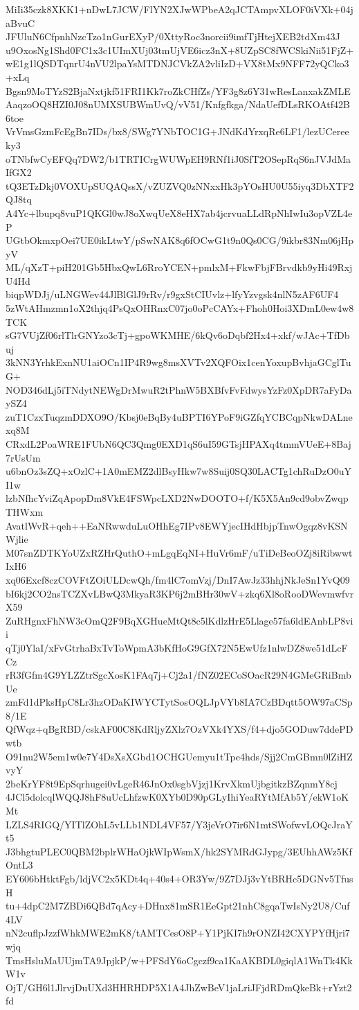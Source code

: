 MiIi35czk8XKK1+nDwL7JCW/FlYN2XJwWPbeA2qJCTAmpvXLOF0iVXk+04jaBvuC
JFUluN6CfpnhNzcTzo1nGurEXyP/0XttyRoc3norcii9imfTjHtejXEB2tdXm43J
u9OxosNg1Shd0FC1x3c1UImXUj03tmUjVE6icz3nX+8UZpSC8fWCSkiNii51FjZ+
wE1g1lQSDTqnrU4nVU2lpaYsMTDNJCVkZA2vliIzD+VX8tMx9NFF72yQCko3+xLq
Bgsn9MoTYzS2BjaNxtjkf51FRI1Kk7roZkCHfZs/YF3g8z6Y31wResLanxakZMLE
AaqzoOQ8HZI0J08nUMXSUBWmUvQ/vV51/Knfgfkga/NdaUefDLsRKOAtf42B6toe
VrVmsGzmFcEgBn7IDs/bx8/SWg7YNbTOC1G+JNdKdYrxqRe6LF1/lezUCereeky3
oTNbfwCyEFQq7DW2/b1TRTICrgWUWpEH9RNf1iJ0SfT2OSepRqS6nJVJdMaIfGX2
tQ3ETzDkj0VOXUpSUQAQssX/vZUZVQ0zNNxxHk3pYOsHU0U55iyq3DbXTF2QJ8tq
A4Yc+lbupq8vuP1QKGl0wJ8oXwqUeX8eHX7ab4jcrvuaLLdRpNhIwIu3opVZL4eP
UGtbOkmxpOei7UE0ikLtwY/pSwNAK8q6fOCwG1t9n0Qs0CG/9ikbr83Nm06jHpyV
ML/qXzT+piH201Gb5HbxQwL6RroYCEN+pmlxM+FkwFbjFBrvdkb9yHi49RxjU4Hd
biqpWDJj/uLNGWev44JlBlGlJ9rRv/r9gxStCIUvlz+lfyYzvgsk4nlN5zAF6UF4
5zWtAHmzmn1oX2thjq4PsQxOHRnxC07jo0oPcCAYx+Fhoh0Hoi3XDmL0ew4w8TCK
sG7VUjZf06rlTlrGNYzo3cTj+gpoWKMHE/6kQv6oDqbf2Hx4+xkf/wJAc+TfDbuj
3kNN3YrhkExnNU1aiOCn1IP4R9wg8msXVTv2XQFOix1cenYoxupBvhjaGCglTuG+
NOD346dLj5iTNdytNEWgDrMwuR2tPhnW5BXBfvFvFdwysYzFz0XpDR7aFyDaySZ4
zuT1CzxTuqzmDDXO9O/Kbsj0eBqBy4uBPTI6YPoF9iGZfqYCBCqpNkwDALnexq8M
CRxdL2PoaWRE1FUbN6QC3Qmg0EXD1qS6uI59GTsjHPAXq4tmmVUeE+8Baj7rUsUm
u6bnOz3sZQ+xOzlC+1A0mEMZ2dlBsyHkw7w8Suij0SQ30LACTg1chRuDzO0uYI1w
lzbNfhcYviZqApopDm8VkE4FSWpcLXD2NwDOOTO+f/K5X5An9cd9obvZwqpTHWxm
AvatlWvR+qeh++EaNRwwduLuOHhEg7IPv8EWYjecIHdHbjpTnwOgqz8vKSNWjlie
M07snZDTKYoUZxRZHrQuthO+mLgqEqNI+HuVr6mF/uTiDeBeoOZj8iRibwwtIxH6
xq06Excf8czCOVFtZOiULDcwQh/fm4lC7omVzj/DnI7AwJz33hhjNkJeSn1YvQ09
bI6kj2CO2nsTCZXvLBwQ3MkyaR3KP6j2mBHr30wV+zkq6Xl8oRooDWevmwfvrX59
ZuRHgnxFhNW3cOmQ2F9BqXGHueMtQt8c5lKdlzHrE5Llage57fa6ldEAnbLP8vii
qTj0YlaI/xFvGtrhaBxTvToWpmA3bKfHoG9GfX72N5EwUfz1nlwDZ8we51dLcFCz
rR3fGfm4G9YLZZtrSgcXosK1FAq7j+Cj2a1/fNZ02ECoSOacR29N4GMeGRiBmbUe
zmFd1dPksHpC8Lr3hzODaKIWYCTytSosOQLJpVYb8IA7CzBDqtt5OW97aCSp8/1E
QfWqz+qBgRBD/cskAF00C8KdRljyZXlz7OzVXk4YXS/f4+djo5GODuw7ddePDwtb
O91nu2W5em1w0e7Y4DsXsXGbd1OCHGUemyu1tTpe4hds/Sjj2CmGBmn0lZiHZvyY
2beKrYF8t9EpSqrhugei0vLgeR46JnOx0sgbVjzj1KrvXkmUjbgitkzBZqnmY8cj
4JCl5dolcqlWQQJ8hF8uUcLhfzwK0XYb0D90pGLyIhiYeaRYtMfAb5Y/ekW1oKMt
LZLS4RIGQ/YITlZOhL5vLLb1NDL4VF57/Y3jeVrO7ir6N1mtSWofwvLOQcJraYt5
J3bhgtuPLEC0QBM2bplrWHaOjkWIpWsmX/hk2SYMRdGJypg/3EUhhAWz5KfOntL3
EY606bHtktFgb/ldjVC2x5KDt4q+40s4+OR3Yw/9Z7DJj3vYtBRHc5DGNv5TfusH
tu+4dpC2M7ZBDi6QBd7qAcy+DHnx81mSR1EeGpt21nhC8gqaTwIsNy2U8/Cuf4LV
nN2cuflpJzzfWhkMWE2mK8/tAMTCesO8P+Y1PjKI7h9rONZI42CXYPYfHjri7wjq
TmsHsluMaUUjmTA9JpjkP/w+PFSdY6oCgczf9ca1KaAKBDL0giqlA1WnTk4KkW1v
OjT/GH6l1JlrvjDuUXd3HHRHDP5X1A4JhZwBeV1jaLriJFjdRDmQkeBk+rYzt2fd

